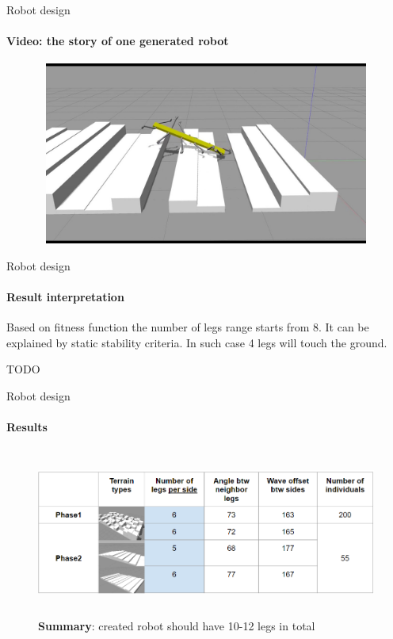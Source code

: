 \documentclass[aspectratio=169,xcolor=table]{beamer}
\begin{document}
\begin{frame}[t]{Robot design}
    \framesubtitle{Video: the story of one generated robot}
    \vspace{-0.6cm}
    \begin{figure}[H]
        \href{https://youtu.be/DcovvkTZgsg}{
            \centering\includegraphics[height=6cm,width=1\textwidth,keepaspectratio]{genetic_video_preview.jpg}}
    \end{figure}
\end{frame}

\begin{frame}[t]{Robot design}
    \framesubtitle{Result interpretation}
    Based on fitness function the number of legs range starts from 8. It can be explained by static stability criteria. In such case 4 legs will touch the ground.

    \alert{TODO}
\end{frame}

\begin{frame}[t]{Robot design}
    \framesubtitle{Results}
    \vspace{-0.5cm}
    \begin{figure}[H]
        \centering\includegraphics[height=5.5cm,width=1\textwidth,keepaspectratio]{table_terrain.png}
        \caption*{\large\centering\textbf{Summary}: created robot should have 10-12 legs in total}
        \label{fig:table_terrain.png}
    \end{figure}
\end{frame}
\end{document}
